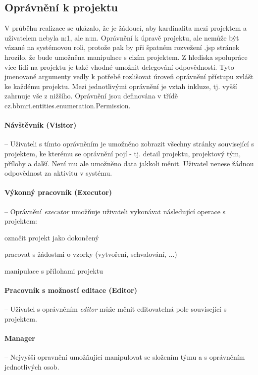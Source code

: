 \subsection{Oprávnění k projektu}
V průběhu realizace se ukázalo, že je žádoucí, aby kardinalita mezi projektem a uživatelem nebyla n:1, ale n:m. Oprávnění k úpravě projektu, ale nemůže být vázané na systémovou roli, protože pak by při špatném rozvežení .jsp stránek hrozilo, že bude umožněna manipulace s cizím projektem. Z hlediska spolupráce více lidí na projektu je také vhodné umožnit delegování odpovědnosti. Tyto jmenované argumenty vedly k potřebě rozlišovat úroveň oprávnění přístupu zvlášt ke každému projektu.
Mezi jednotlivými oprávnění je vztah inkluze, tj. vyšší zahrnuje vše z nižšího. Oprávnění jsou definována v třídě cz.bbmri.entities.enumeration.Permission.
\paragraph*{Návštěvník (Visitor)} -- Uživateli s tímto oprávněním je umožněno zobrazit všechny stránky související s projektem, ke kterému se oprávnění pojí - tj. detail projektu, projektový tým, přílohy a další. Není mu ale umožněno data jakkoli měnit. Uživatel nenese žádnou odpovědnost za aktivitu v systému.
\paragraph*{Výkonný pracovník (Executor)} -- Oprávnění \textit{executor} umožňuje uživateli vykonávat následující operace s projektem:
\begin{compactitem}
	\item označit projekt jako dokončený
	\item pracovat s žádostmi o vzorky (vytvoření, schvalování, ...)
	\item manipulace s přílohami projektu
\end{compactitem}

\paragraph*{Pracovník s možností editace (Editor)} -- Uživatel s oprávněním \textit{editor} může měnit editovatelná pole související s projektem.
\paragraph*{Manager} -- Nejvyšší opravnění umožňující manipulovat se složením týmu a s oprávněním jednotlivých osob.


